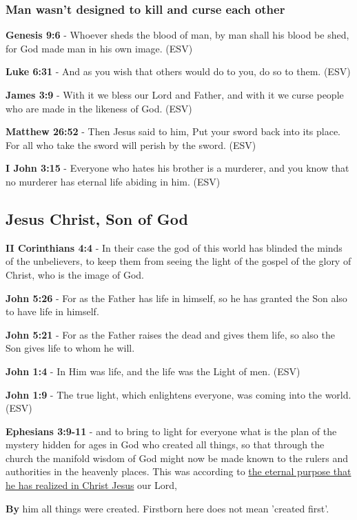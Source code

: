 \documentclass[11pt]{article}
\begin{document}
\subsubsection{Man wasn't designed to kill and curse each other}
\label{sec:orgf74e370}
\textbf{Genesis 9:6} - Whoever sheds the blood of man, by man shall his blood be shed, for God made man in his own image. (ESV)

\textbf{Luke 6:31} - And as you wish that others would do to you, do so to them. (ESV)

\textbf{James 3:9} - With it we bless our Lord and Father, and with it we curse people who are made in the likeness of God. (ESV)

\textbf{Matthew 26:52} - Then Jesus said to him, Put your sword back into its place.  For all who take the sword will perish by the sword. (ESV)

\textbf{I John 3:15} - Everyone who hates his brother is a murderer, and you know that no murderer has eternal life abiding in him. (ESV)

\subsection{Jesus Christ, Son of God}
\label{sec:org2b4aacd}
\textbf{II Corinthians 4:4} - In their case the god of this world has blinded the minds of the unbelievers, to keep them from seeing the light of the gospel of the glory of Christ, who is the image of God.

\textbf{John 5:26} - For as the Father has life in himself, so he has granted the Son also to have life in himself.

\textbf{John 5:21} - For as the Father raises the dead and gives them life, so also the Son gives life to whom he will.

\textbf{John 1:4} - In Him was life, and the life was the Light of men. (ESV)

\textbf{John 1:9} - The true light, which enlightens everyone, was coming into the world. (ESV)

\textbf{Ephesians 3:9-11} - and to bring to light for everyone what is the plan of the mystery hidden for ages in God who created all things, so that through the church the manifold wisdom of God might now be made known to the rulers and authorities in the heavenly places. This was according to \uline{the eternal purpose that he has realized in Christ Jesus} our Lord,

\textbf{By} him all things were created. Firstborn here does not mean 'created first'.
\end{document}
